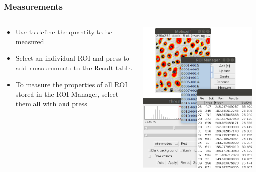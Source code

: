 \documentclass[ignorenonframetext,aspectratio=169,10pt,xcolor=table]{beamer}
\begin{document}
\begin{frame} \frametitle{Measurements}
  \begin{columns}
    \begin{column}{0.65\textwidth}
      \begin{itemize}
      \item Use  to define the
        quantity to be measured
      \item Select an individual ROI and press  to add
        measurements to the Result table.
      \item To measure the properties of all ROI stored in the ROI
        Manager, select them all with  and press 
      \end{itemize}
    \end{column}
    \begin{column}{0.35\textwidth}
      \includegraphics[width=\textwidth]{measure}
    \end{column}
  \end{columns}
\end{frame}
\end{document}
